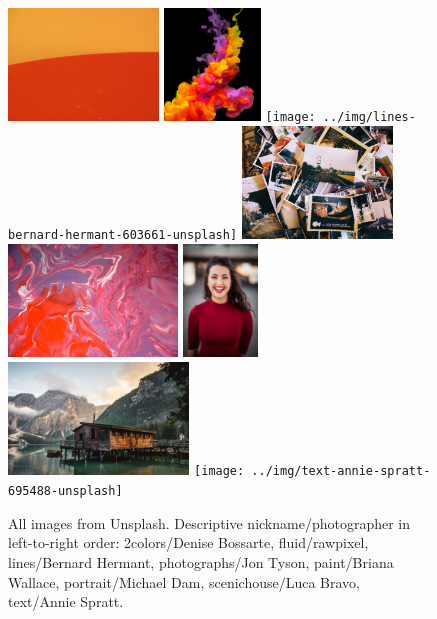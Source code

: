 
\begin{figure}[h]
\includegraphics[height=3cm]{../img/2colors-denise-bossarte-263147-unsplash}
\includegraphics[height=3cm]{../img/fluid-rawpixel-652643-unsplash}
\texttt{[image: ../img/lines-bernard-hermant-603661-unsplash]}
\includegraphics[height=3cm]{../img/photographs-jon-tyson-762647-unsplash}
\\
\includegraphics[height=3cm]{../img/paint-briana-wallace-783301-unsplash}
\includegraphics[height=3cm]{../img/portrait-michael-dam-258165-unsplash}
\includegraphics[height=3cm]{../img/scenichouse-luca-bravo-177552-unsplash}
\texttt{[image: ../img/text-annie-spratt-695488-unsplash]}
\caption{All images from Unsplash. Descriptive nickname/photographer in left-to-right order: 2colors/Denise Bossarte, fluid/rawpixel, lines/Bernard Hermant, photographs/Jon Tyson, paint/Briana Wallace, portrait/Michael Dam, scenichouse/Luca Bravo, text/Annie Spratt.}
\end{figure}
